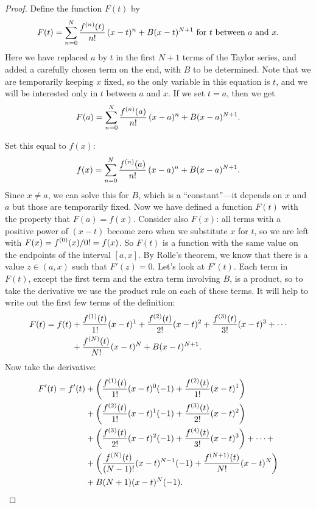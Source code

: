 \begin{proof}
Define the function $F(t)$ by 
\[
F(t)=\sum_{n=0}^N{f^{(n)}(t)\over n!}\,(x-t)^n + B(x-t)^{N+1} \mbox{ for $t$ between $a$ and $x$.}
\]
Here we have replaced $a$ by $t$ in the first $N+1$ terms of the
Taylor series, and added a carefully chosen term on the end, with $B$
to be determined. Note that
we are temporarily keeping $x$ fixed, so the only variable in this
equation is $t$, and we will be interested
only in $t$ between $a$ and $x$.  If we set $t = a$, then we get
\[
F(a)=\sum_{n=0}^N{f^{(n)}(a)\over n!}\,(x-a)^n + B(x-a)^{N+1}.
\]

Set this equal to $f(x)$:
$$f(x)=\sum_{n=0}^N{f^{(n)}(a)\over n!}\,(x-a)^n + B(x-a)^{N+1}.$$
Since $x\not=a$, we can solve this for $B$, which is a
``constant''---it depends on $x$ and $a$ but those are temporarily 
fixed.  Now we
have defined a function $F(t)$ with the property that
$F(a)=f(x)$. Consider also $F(x)$: all terms with a positive power of
$(x-t)$ become zero when we substitute $x$ for $t$, so we are left
with $\displaystyle F(x)=f^{(0)}(x)/0!=f(x)$. So $F(t)$ is a function with the same
value on the endpoints of the interval $[a,x]$. 
By Rolle's theorem, we
know that there is a value $z\in(a,x)$ such that $F'(z)=0$. Let's look
at $F'(t)$. Each term in $F(t)$, except the first term and the extra
term involving $B$, is a product, so to take the derivative we use the
product rule on each of these terms. It will help to write out the
first few terms of the definition:
\begin{align*}
  F(t)=f(t)&+{f^{(1)}(t)\over 1!}(x-t)^1+{f^{(2)}(t)\over 2!}(x-t)^2+
  {f^{(3)}(t)\over 3!}(x-t)^3+\cdots \\
  &+{f^{(N)}(t)\over N!}(x-t)^N+
  B(x-t)^{N+1}. \\
\end{align*}
Now take the derivative:
\begin{align*}
  F'(t) = f'(t) &+ 
  \left({f^{(1)}(t)\over 1!}(x-t)^0(-1)+{f^{(2)}(t)\over
    1!}(x-t)^1\right) \\
  &+\left({f^{(2)}(t)\over 1!}(x-t)^1(-1)+{f^{(3)}(t)\over
    2!}(x-t)^2\right) \\
  &+\left({f^{(3)}(t)\over 2!}(x-t)^2(-1)+{f^{(4)}(t)\over
    3!}(x-t)^3\right)+\dots+ \\
  &+\left({f^{(N)}(t)\over (N-1)!}(x-t)^{N-1}(-1)+{f^{(N+1)}(t)\over
    N!}(x-t)^N\right) \\
  &+B(N+1)(x-t)^N(-1). \\

\end{align*}
\end{proof}
